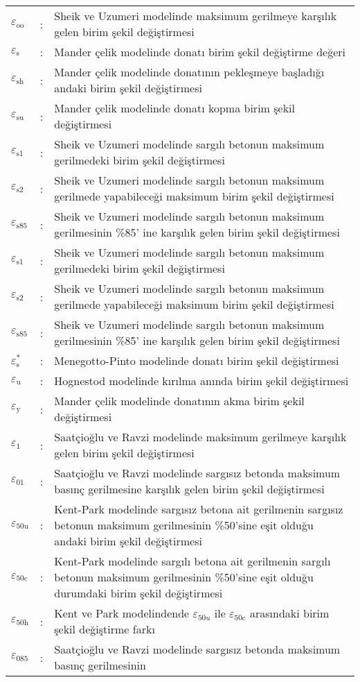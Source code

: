 \begin{longtable}{>{\raggedright}p{1cm}l>{\raggedright}p{13.4cm}}
$\varepsilon_{\text{oo}}$ & : & Sheik ve Uzumeri modelinde maksimum gerilmeye karşılık gelen birim
şekil değiştirmesi \tabularnewline
$\varepsilon_{\text{s}}$ & : & Mander çelik modelinde donatı birim şekil değiştirme değeri\tabularnewline
$\varepsilon_{\text{sh}}$ & : & Mander çelik modelinde donatının pekleşmeye başladığı andaki birim
şekil değiştirmesi\tabularnewline
$\varepsilon_{\text{su}}$ & : & Mander çelik modelinde donatı kopma birim şekil değiştirmesi\tabularnewline
$\varepsilon_{\text{s1}}$ & : & Sheik ve Uzumeri modelinde sargılı betonun maksimum gerilmedeki birim
şekil değiştirmesi\tabularnewline
$\varepsilon_{\text{s2}}$ & : & Sheik ve Uzumeri modelinde sargılı betonun maksimum gerilmede yapabileceği
maksimum birim şekil değiştirmesi\tabularnewline
$\varepsilon_{\text{s85}}$ & : & Sheik ve Uzumeri modelinde sargılı betonun maksimum gerilmesinin \%85'
ine karşılık gelen birim şekil değiştirmesi\tabularnewline
$\varepsilon_{\text{s1}}$ & : & Sheik ve Uzumeri modelinde sargılı betonun maksimum gerilmedeki birim
şekil değiştirmesi\tabularnewline
$\varepsilon_{\text{s2}}$ & : & Sheik ve Uzumeri modelinde sargılı betonun maksimum gerilmede yapabileceği
maksimum birim şekil değiştirmesi\tabularnewline
$\varepsilon_{\text{s85}}$ & : & Sheik ve Uzumeri modelinde sargılı betonun maksimum gerilmesinin \%85'
ine karşılık gelen birim şekil değiştirmesi\tabularnewline
$\varepsilon_{\text{s}}^{*}$ & : & Menegotto-Pinto modelinde donatı birim şekil değiştirmesi\tabularnewline
$\varepsilon_{\text{u}}$ & : & Hognestod modelinde kırılma anında birim şekil değiştirmesi\tabularnewline
$\varepsilon_{\text{y}}$ & : & Mander çelik modelinde donatının akma birim şekil değiştirmesi\tabularnewline
$\varepsilon_{\text{1}}$ & : & Saatçioğlu ve Ravzi modelinde maksimum gerilmeye karşılık gelen birim
şekil değiştirmesi\tabularnewline
$\varepsilon_{\text{01}}$ & : & Saatçioğlu ve Ravzi modelinde sargısız betonda maksimum basınç gerilmesine
karşılık gelen birim şekil değiştirmesi\tabularnewline
$\varepsilon_{\text{50u}}$ & : & Kent-Park modelinde sargısız betona ait gerilmenin sargısız betonun
maksimum gerilmesinin \%50’sine eşit olduğu andaki birim şekil değiştirmesi\tabularnewline
$\varepsilon_{\text{50c}}$ & : & Kent-Park modelinde sargılı betona ait gerilmenin sargılı betonun
maksimum gerilmesinin \%50’sine eşit olduğu durumdaki birim şekil
değiştirmesi\tabularnewline
$\varepsilon_{\text{50h}}$ & : & Kent ve Park modelindende $\mathit{\varepsilon_{\text{50u}}}$ ile
$\varepsilon_{\text{50c}}$ arasındaki birim şekil değiştirme farkı\tabularnewline
$\varepsilon_{\text{085}}$ & : & Saatçioğlu ve Ravzi modelinde sargısız betonda maksimum basınç gerilmesinin

\end{longtable}

